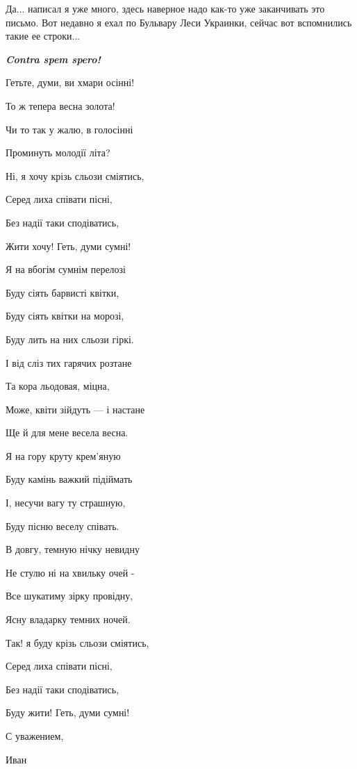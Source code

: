 Да... написал я уже много, здесь наверное надо как-то уже заканчивать это письмо.
Вот недавно я ехал по Бульвару Леси Украинки, сейчас вот вспомнились такие ее строки...

\raggedcolumns
\begin{multicols}{2} %
\setlength{\parindent}{0pt}
\begingroup
\bfseries\em\color{blue} Contra spem spero!\par
\endgroup
\smallskip
Гетьте, думи, ви хмари осінні!\par
То ж тепера весна золота!\par
Чи то так у жалю, в голосінні\par
Проминуть молодії літа?\par
\smallskip\par
Ні, я хочу крізь сльози сміятись,\par
Серед лиха співати пісні,\par
Без надії таки сподіватись,\par
Жити хочу! Геть, думи сумні!\par
\smallskip\par
Я на вбогім сумнім перелозі\par
Буду сіять барвисті квітки,\par
Буду сіять квітки на морозі,\par
Буду лить на них сльози гіркі.\par
\smallskip\par
І від сліз тих гарячих розтане\par
Та кора льодовая, міцна,\par
Може, квіти зійдуть — і настане\par
Ще й для мене весела весна.\par
\smallskip\par
Я на гору круту крем'яную\par
Буду камінь важкий підіймать\par
І, несучи вагу ту страшную,\par
Буду пісню веселу співать.\par
\smallskip\par
В довгу, темную нічку невидну\par
Не стулю ні на хвильку очей -\par
Все шукатиму зірку провідну,\par
Ясну владарку темних ночей.\par
\smallskip\par
Так! я буду крізь сльози сміятись,\par
Серед лиха співати пісні,\par
Без надії таки сподіватись,\par
Буду жити! Геть, думи сумні!\par
\end{multicols} %

С уважением,

Иван

